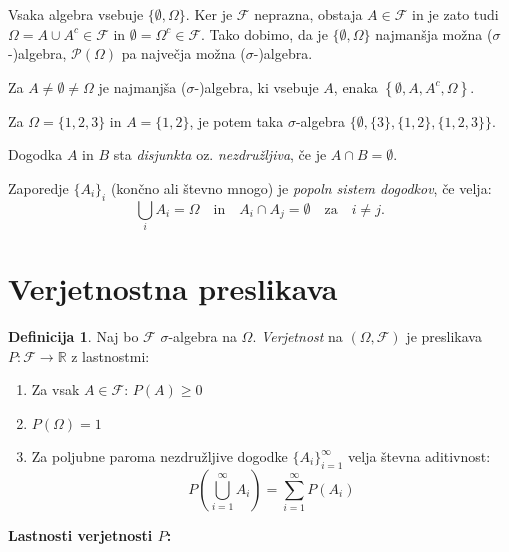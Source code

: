 \documentclass[12pt]{book}
\def\n{\noindent}
\theoremstyle{definition}
\newtheorem{definicija}{Definicija}
\theoremstyle{plain}
\theoremstyle{plain}
\theoremstyle{plain}
\theoremstyle{remark}
\begin{document}
\n Vsaka algebra vsebuje $\{\emptyset, \Omega\}$. Ker je $\mathcal{F}$ neprazna, obstaja $A \in \mathcal{F}$ in je zato tudi $\Omega=A \cup A^c \in \mathcal{F}$ in $\emptyset=\Omega^c \in \mathcal{F}$. Tako dobimo, da je $\{\emptyset, \Omega\}$ najmanšja možna ($\sigma$-)algebra, $\mathcal{P}(\Omega)$ pa največja možna ($\sigma$-)algebra.

\begin{zgled}
    Za $A \neq \emptyset \neq \Omega$ je najmanjša ($\sigma$-)algebra, ki vsebuje $A$, enaka $\left\{\emptyset, A, A^c, \Omega\right\}$. 

    \n Za $\Omega=\{1,2,3\}$ in $A=\{1,2\}$, je potem taka $\sigma$-algebra $\{\emptyset,\{3\},\{1,2\},\{1,2,3\}\}$.
\end{zgled}

\n Dogodka $A$ in $B$ sta \emph{disjunkta} oz. \emph{nezdružljiva}, če je $A \cap B=\emptyset$. 

\n Zaporedje $\{A_i\}_i$ (končno ali števno mnogo) je \emph{popoln sistem dogodkov}, če velja: $$\bigcup_i A_i=\Omega \quad \text{in} \quad A_i \cap A_j = \emptyset \quad \text{za} \quad i \neq j.$$ 

\section{Verjetnostna preslikava}

\begin{definicija}
    Naj bo $\mathcal{F}$ $\sigma$-algebra na $\Omega$. \emph{Verjetnost} na $(\Omega, \mathcal{F})$ je preslikava $P:\mathcal{F} \to \mathbb{R}$ z lastnostmi:
    \begin{enumerate}
        \item Za vsak $A \in \mathcal{F}$: $P(A) \geq 0 $
        \item $P(\Omega) = 1$
        \item Za poljubne paroma nezdružljive dogodke $\{A_i\}_{i=1}^{\infty}$ velja števna aditivnost: $$P\left(\bigcup_{i=1}^{\infty} A_i\right)=\sum_{i=1}^{\infty} P\left(A_i\right)$$
    \end{enumerate}
\end{definicija}

\n \textbf{Lastnosti verjetnosti $P$:}
\end{document}
